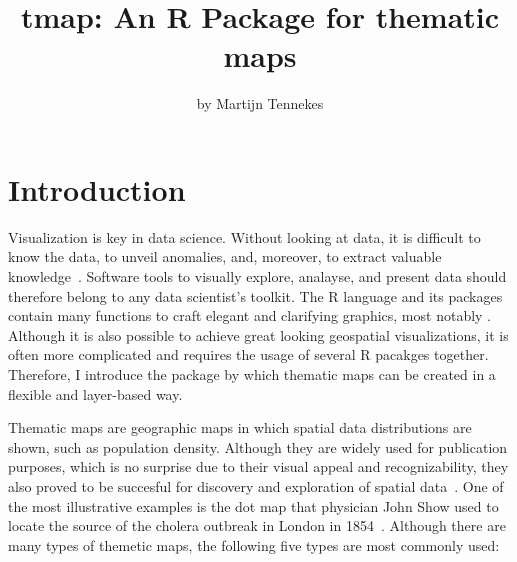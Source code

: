 \title{tmap: An R Package for thematic maps}
\author{by Martijn Tennekes}

\maketitle




\section{Introduction}

Visualization is key in data science. Without looking at data, it is difficult to know the data, to unveil anomalies, and, moreover, to extract valuable knowledge~\citep{tufte83}. Software tools to visually explore, analayse, and present data should therefore belong to any data scientist's toolkit. The R language and its packages contain many functions to craft elegant and clarifying graphics, most notably \citep{ggplot2}. Although it is also possible to achieve great looking geospatial visualizations, it is often more complicated and requires the usage of several R pacakges together. Therefore, I introduce the  package by which thematic maps can be created in a flexible and layer-based way.

Thematic maps are geographic maps in which spatial data distributions are shown, such as population density. Although they are widely used for publication purposes, which is no surprise due to their visual appeal and recognizability, they also proved to be succesful for discovery and exploration of spatial data~\citep{friendly95}. One of the most illustrative examples is the dot map that physician John Show used to locate the source of the cholera outbreak in London in 1854~\citep{snow1855}. Although there are many types of themetic maps, the following five types are most commonly used:

